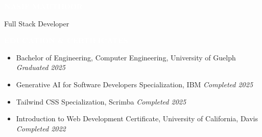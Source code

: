 \documentclass[9pt]{src/developercv}
\begin{document}
  \pagecolor{white}

  \colorbox{sky900}{\hspace{0.3cm}\HUGE\textcolor{white}{\textbf{\MakeUppercase{Nasif}}}\hspace{0.3cm}}
  \colorbox{sky800}{\hspace{0.3cm}\HUGE\textcolor{white}{\textbf{\MakeUppercase{Mauthoor}}}\hspace{0.3cm}}
  
  \vspace{0.3cm}
  \hspace{0.1cm}
  \vcenteredhbox{\textcolor{black}{Oakville, ON}}
  \hfill
  \hspace{0.1cm}
  \vcenteredhbox{\textcolor{black}{416-655-2083}}
  \hfill
  \hspace{0.1cm}
  \hfill
  \hspace{0.1cm}
  
  \vspace{0.3cm}
  {\huge Full Stack Developer}

  \vspace{\baselineskip}
  \colorbox{sky950}{\textcolor{white}{\LARGE\MakeUppercase{\textbf{Education \& Certificates}}}}
  \begin{itemize}[leftmargin=2em, itemsep=0.1em]
    \item Bachelor of Engineering, Computer Engineering, University of Guelph \hfill \textit{Graduated 2025}
    \item Generative AI for Software Developers Specialization, IBM \hfill \textit{Completed 2025}
    \item Tailwind CSS Specialization, Scrimba \hfill \textit{Completed 2025}
    \item Introduction to Web Development Certificate, University of California, Davis \hfill \textit{Completed 2022}
  \end{itemize}
\end{document}

